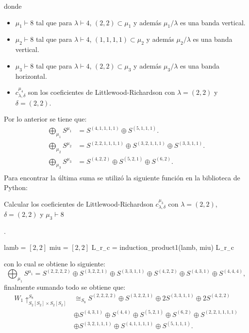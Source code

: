 \documentclass[12pt]{book}
\theoremstyle{definition}
\newcounter{in}
\begin{document}
donde 
\begin{itemize}
\item $\mu_{1} \vdash 8$ tal que para $\lambda \vdash 4$, $(2,2) \subset \mu_{1}$ y además $\mu_{1} / \lambda$ es una banda vertical. 
\item $\mu_{2} \vdash 8$ tal que para $\lambda \vdash 4$, $(1,1,1,1) \subset \mu_{2}$ y además $\mu_{2} / \lambda$ es una banda vertical.
\item $\mu_{3} \vdash 8$ tal que para $\lambda \vdash 4$, $(2,2) \subset \mu_{3}$ y además $\mu_{3} / \lambda$ es una banda horizontal.
\item $c_{\lambda,\delta}^{\mu_{4}}$ son los coeficientes de Littlewood-Richardson con $\lambda = (2,2)$ y $\delta = (2,2)$.
\end{itemize}
Por lo anterior se tiene que:
\begin{equation}
\begin{aligned}
\bigoplus_{\mu_{1}} S^{\mu_{1}} & = S^{(4, 1, 1, 1, 1)} \oplus S^{(5, 1, 1, 1)}. \\
\bigoplus_{\mu_{2}} S^{\mu_{2}} & = S^{(2, 2, 1, 1, 1, 1)} \oplus S^{(3, 2, 1, 1, 1)} \oplus S^{(3, 3, 1, 1)}. \\
\bigoplus_{\mu_{3}} S^{\mu_{3}} & = S^{(4, 2, 2)} \oplus S^{(5, 2, 1)} \oplus S^{(6, 2)}. \\
\end{aligned}
\end{equation}
Para encontrar la última suma se utilizó la siguiente función en
la biblioteca de Python:
\begin{algorithm}[H]
\caption{Calcular los coeficientes de Littlewood-Richardson $c_{\lambda,\delta}^{\mu_{3}}$ con $\lambda = (2,2)$, $\delta = (2,2)$ y $\mu_{3} \vdash 8$}.
\begin{algorithmic}
\STATE lamb = $\left [ 2, 2 \right ]$
\STATE miu = $\left [ 2, 2 \right ]$
\STATE L$_{-}$r$_{-}$c = induction$_{-}$product1(lamb, miu)
\PRINT L$_{-}$r$_{-}$c
\end{algorithmic}
\end{algorithm}
con lo cual se obtiene lo siguiente:
\begin{equation}
\bigoplus_{\mu_{1}} S^{\mu_{1}}  = S^{(2, 2, 2, 2)} \oplus S^{(3, 2, 2, 1)} \oplus S^{(3, 3, 1, 1)} \oplus S^{(4, 2, 2)} \oplus S^{(4, 3, 1)} \oplus S^{(4, 4, 4)},
\end{equation}
finalmente sumando todo se obtiene que:
\begin{equation}
\label{s_w_1}
\begin{aligned}
W_{1} \uparrow_{S_{2} \left [ S_{2} \right ] \times S_{2} \left [ S_{2} \right ]}^{S_{8}} & \cong_{S_{8}} S^{(2, 2, 2, 2)} \oplus S^{(3, 2, 2, 1)} \oplus  2S^{(3, 3, 1, 1)} \oplus 2S^{(4, 2, 2)} \\
& \oplus S^{(4, 3, 1)} \oplus S^{(4, 4)} \oplus S^{(5, 2, 1)} \oplus S^{(6, 2)} \oplus S^{(2, 2, 1, 1, 1, 1)} \\
& \oplus S^{(3, 2, 1, 1, 1)} \oplus S^{(4, 1, 1, 1, 1)} \oplus S^{(5, 1, 1, 1)}.
\end{aligned}
\end{equation}
\end{document}
